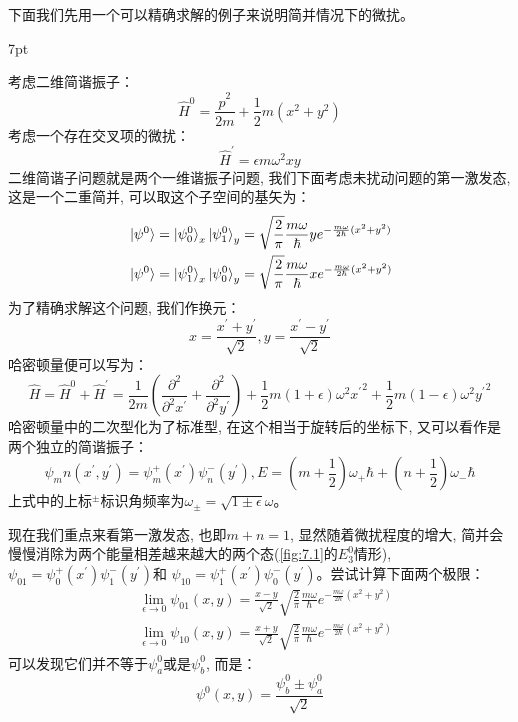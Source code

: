 \documentclass[a4paper,zihao=-4,linespread=1]{ctexrep}
\newenvironment{thinknote}{%
\def\FrameCommand{%
\hspace{1pt}%
{\color{BurlyWood}\vrule width 2pt}%
{\color{formalshade}\vrule width 4pt}%
\colorbox{formalshade}%
}%
\MakeFramed{\advance\hsize-\width\FrameRestore}%
\noindent\hspace{-4.55pt}%
\begin{adjustwidth}{}{7pt}%
\vspace{2pt}\vspace{2pt}%
}
{%
\vspace{2pt}\end{adjustwidth}\endMakeFramed%
}
\begin{document}
    下面我们先用一个可以精确求解的例子来说明简并情况下的微扰。
    \begin{thinknote}
        考虑二维简谐振子：
        \[\hat{H}^0=\frac{\hat{p}^2}{2m}+\frac{1}{2}m\left(x^2+y^2\right)\]
        考虑一个存在交叉项的微扰：
        \[\hat{H}^\prime=\epsilon m \omega^2 xy\]
        二维简谐子问题就是两个一维谐振子问题, 我们下面考虑未扰动问题的第一激发态, 这是一个二重简并, 可以取这个子空间的基矢为：
        \begin{align*}
            &\ket{\psi^0}=\ket{\psi^0_0}_x\ket{\psi_1^0}_y=\sqrt{\frac{2}{\pi}}\frac{m\omega}{\hbar}y e^{-\frac{m \omega}{2\hbar}(x^2+y^2)}\\
            &\ket{\psi^0}=\ket{\psi^0_1}_x\ket{\psi_0^0}_y=\sqrt{\frac{2}{\pi}}\frac{m\omega}{\hbar}x e^{-\frac{m \omega}{2\hbar}(x^2+y^2)}
        \end{align*}
        为了精确求解这个问题, 我们作换元：
        \[x=\frac{x^\prime+y^\prime}{\sqrt{2}},y=\frac{x^\prime-y^\prime}{\sqrt{2}}\]
        哈密顿量便可以写为：
        \[\hat{H}=\hat{H}^0+\hat{H}^\prime=\frac{1}{2m}\left(\frac{\partial^2}{\partial^2 x^\prime}+\frac{\partial^2}{\partial^2 y^\prime}\right)+\frac{1}{2}m(1+\epsilon)\omega^2 {x^\prime}^2+\frac{1}{2}m(1-\epsilon)\omega^2{y^\prime}^2\]
        哈密顿量中的二次型化为了标准型, 在这个相当于旋转后的坐标下, 又可以看作是两个独立的简谐振子：
        \[\psi_mn(x^\prime,y^\prime)=\psi^+_m(x^\prime)\psi^-_n(y^\prime),E=\left(m+\frac{1}{2}\right)\omega_+\hbar+\left(n+\frac{1}{2}\right)\omega_-\hbar\]
        上式中的上标$^\pm$标识角频率为$\omega_\pm=\sqrt{1\pm\epsilon}\omega$。

        \setlength\parindent{2em}现在我们重点来看第一激发态, 也即$m+n=1$, 显然随着微扰程度的增大, 简并会慢慢消除为两个能量相差越来越大的两个态(\ref{fig:7.1}的$E_3^0$情形), $\psi_{01}=\psi^+_0(x^\prime)\psi^-_1(y^\prime)$和
        $\psi_{10}=\psi^+_1(x^\prime)\psi^-_0(y^\prime)$。尝试计算下面两个极限：
        \begin{align*}
            &\lim_{\epsilon\to0}\psi_{01}(x,y)=\frac{x-y}{\sqrt{2}}\sqrt{\frac{2}{\pi}}\frac{m\omega}{\hbar} e^{-\frac{m \omega}{2\hbar}(x^2+y^2)}\\
            &\lim_{\epsilon\to0}\psi_{10}(x,y)=\frac{x+y}{\sqrt{2}}\sqrt{\frac{2}{\pi}}\frac{m\omega}{\hbar} e^{-\frac{m \omega}{2\hbar}(x^2+y^2)}
        \end{align*}
        可以发现它们并不等于$\psi^0_a$或是$\psi^0_b$, 而是：
        $$\psi^0(x,y)=\frac{\psi_b^0\pm\psi_a^0}{\sqrt{2}}$$
    \end{thinknote}
\end{document}
